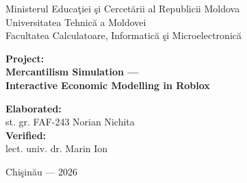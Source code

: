 \documentclass[12pt,a4paper]{article}
\begin{document}
\begin{titlepage}
    \centering
    \vspace*{1cm}

    {\Large Ministerul Educa\c{t}iei \c{s}i Cercet\u{a}rii al Republicii Moldova\\}
    \vspace{0.5cm}
    {\Large Universitatea Tehnic\u{a} a Moldovei\\}
    \vspace{0.5cm}
    {\Large Facultatea Calculatoare, Informatic\u{a} \c{s}i Microelectronic\u{a}\\}

    \vspace{3cm}

    {\LARGE \textbf{Project:}\\}
    \vspace{0.5cm}
    {\LARGE \textbf{Mercantilism Simulation ---}\\}
    \vspace{0.3cm}
    {\LARGE \textbf{Interactive Economic Modelling in Roblox}\\}

    \vfill

    \begin{flushleft}
        \hspace{7cm}\textbf{Elaborated:}\\
        \hspace{7cm}st. gr. FAF-243 Norian Nichita\\
        \vspace{1cm}
        \hspace{7cm}\textbf{Verified:}\\
        \hspace{7cm}lect. univ. dr. Marin Ion\\
    \end{flushleft}

    \vspace{1cm}
    {\large Chi\c{s}in\u{a}u --- 2026}
\end{titlepage}

\newpage
\tableofcontents
\thispagestyle{empty}

\newpage
\setcounter{page}{3}
\end{document}
